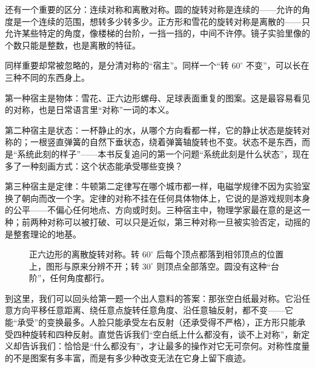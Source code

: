 还有一个重要的区分：连续对称和离散对称。圆的旋转对称是连续的——允许的角度是一个连续的范围，想转多少转多少。正方形和雪花的旋转对称是离散的——只允许某些特定的角度，像楼梯的台阶，一挡一挡的，中间不许停。镜子实验里像的个数只能是整数，也是离散的特征。

同样重要却常被忽略的，是分清对称的“宿主”。同样一个“转 \(60^\circ\) 不变”，可以长在三种不同的东西身上。

第一种宿主是物体：雪花、正六边形螺母、足球表面重复的图案。这是最容易看见的对称，也是日常语言里“对称”一词的本义。

第二种宿主是状态：一杯静止的水，从哪个方向看都一样，它的静止状态是旋转对称的；一根竖直弹簧的自然下垂状态，绕着弹簧轴旋转也不变。状态不是东西，而是“系统此刻的样子”——本书反复追问的第一个问题“系统此刻是什么状态”，现在多了一种刻画方式：这个状态能承受哪些变换？

第三种宿主是定律：牛顿第二定律写在哪个城市都一样，电磁学规律不因为实验室换了朝向而改一个字。定律的对称不挂在任何具体物体上，它说的是游戏规则本身的公平——不偏心任何地点、方向或时刻。三种宿主中，物理学家最在意的是这一种；前两种对称可以被打破、可以只是近似，第三种对称一旦被实验否定，动摇的是整套理论的地基。

\begin{figure}[htbp]
\centering
{}
\caption{正六边形的离散旋转对称。转 \(60^\circ\) 后每个顶点都落到相邻顶点的位置上，图形与原来分辨不开；转 \(30^\circ\) 则顶点全部落空。圆没有这种“台阶”，任何角度都行。}
\end{figure}

到这里，我们可以回头给第一题一个出人意料的答案：那张空白纸最对称。它沿任意方向平移任意距离、绕任意点旋转任意角度、沿任意轴反射，都不变——它能“承受”的变换最多。人脸只能承受左右反射（还承受得不严格），正方形只能承受四种旋转和四种反射。直觉告诉我们“空白纸上什么都没有，谈不上对称”，新定义却告诉我们：恰恰是“什么都没有”，才让最多的操作对它无可奈何。对称性度量的不是图案有多丰富，而是有多少种改变无法在它身上留下痕迹。

